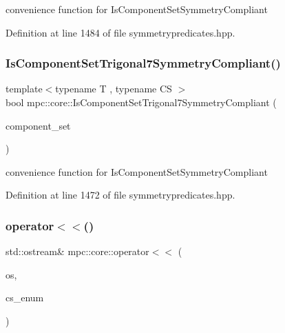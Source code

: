convenience function for Is\+Component\+Set\+Symmetry\+Compliant 



Definition at line 1484 of file symmetrypredicates.\+hpp.

\mbox{\label{namespacempc_1_1core_af046341a578d766d11560ed1b6f35ff8}} 
\subsubsection{\texorpdfstring{Is\+Component\+Set\+Trigonal7\+Symmetry\+Compliant()}{IsComponentSetTrigonal7SymmetryCompliant()}}
{\footnotesize\ttfamily template$<$typename T , typename CS $>$ \\
bool mpc\+::core\+::\+Is\+Component\+Set\+Trigonal7\+Symmetry\+Compliant (\begin{DoxyParamCaption}\item[{const std\+::set$<$ \mbox{\hyperlink{namespacempc_1_1core_ac3a232afc7c680d580628e834030482f}{mpc\+::core\+::\+Tensor\+Rank4\+Component}}$<$ T $>$ $>$ \&}]{component\+\_\+set }\end{DoxyParamCaption})}



convenience function for Is\+Component\+Set\+Symmetry\+Compliant 



Definition at line 1472 of file symmetrypredicates.\+hpp.

\mbox{\label{namespacempc_1_1core_a742f3f5b4c1f5b579247c0937bdb6015}} 
\subsubsection{\texorpdfstring{operator$<$$<$()}{operator<<()}\hspace{0.1cm}{\footnotesize\ttfamily [1/4]}}
{\footnotesize\ttfamily std\+::ostream\& mpc\+::core\+::operator$<$$<$ (\begin{DoxyParamCaption}\item[{std\+::ostream \&}]{os,  }\item[{\mbox{\hyperlink{namespacempc_1_1core_ad3e8e7d43bfc9202d954d999f7d5c991}{C\+S\+Enumeration}}}]{cs\+\_\+enum }\end{DoxyParamCaption})\hspace{0.3cm}{\ttfamily [inline]}}



